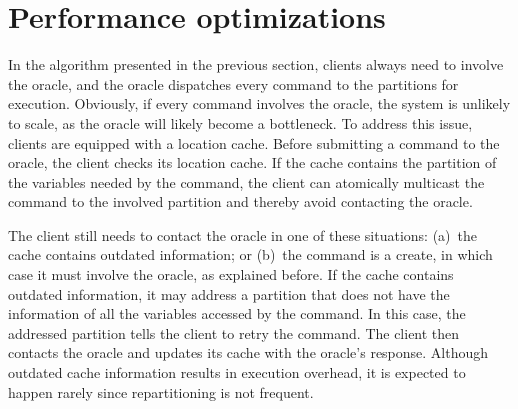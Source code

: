 \section{Performance optimizations}
\label{sec:dynastar-optm}

In the algorithm presented in the previous section, clients always need to
involve the oracle, and the oracle dispatches every command to the partitions
for execution. Obviously, if every command involves the oracle, the system is
unlikely to scale, as the oracle will likely become a bottleneck. To address
this issue, clients are equipped with a location cache. Before submitting a
command to the oracle, the client checks its location cache. If the cache
contains the partition of the variables needed by the command, the client can
atomically multicast the command to the involved partition and thereby avoid
contacting the oracle.

The client still needs to contact the oracle in one of these situations: (a)~the
cache contains outdated information; or (b)~the command is a create, in
which case it must involve the oracle, as explained before. If the cache contains
outdated information, it may address a partition that does not have the
information of all the variables accessed by the command. In this case, the
addressed partition tells the client to retry the command. The client then
contacts the oracle and updates its cache with the oracle's response. Although
outdated cache information results in execution overhead, it is expected to
happen rarely since repartitioning is not frequent.
